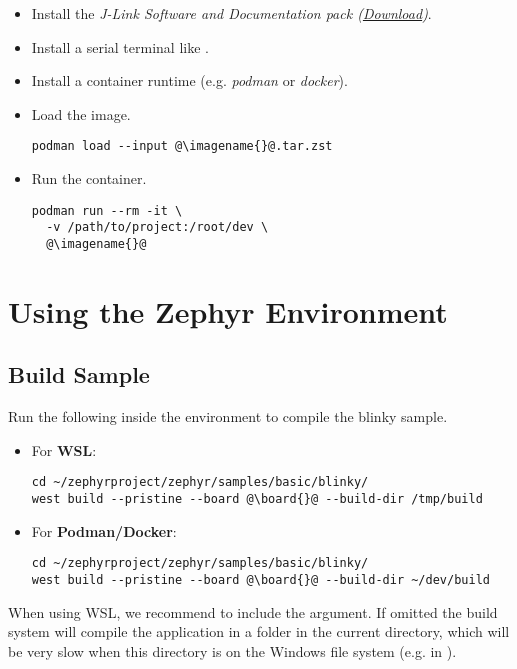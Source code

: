 \begin{itemize}
  \item Install the \emph{J-Link Software and Documentation pack (\href{https://www.segger.com/downloads/jlink}{Download})}.
  \item Install a serial terminal like .
  \item Install a container runtime (e.g. \emph{podman} or \emph{docker}).
  \item Load the image.
        \begin{lstlisting}
podman load --input @\imagename{}@.tar.zst
\end{lstlisting}
  \item Run the container.
        \begin{lstlisting}
podman run --rm -it \
  -v /path/to/project:/root/dev \
  @\imagename{}@
\end{lstlisting}
\end{itemize}

\newpage

\section{Using the Zephyr Environment}

\subsection{Build Sample}

Run the following inside the environment to compile the blinky sample.

\begin{itemize}
  \item For \textbf{WSL}:
  \begin{lstlisting}
cd ~/zephyrproject/zephyr/samples/basic/blinky/
west build --pristine --board @\board{}@ --build-dir /tmp/build
\end{lstlisting}
  \item For \textbf{Podman/Docker}:
  \begin{lstlisting}
cd ~/zephyrproject/zephyr/samples/basic/blinky/
west build --pristine --board @\board{}@ --build-dir ~/dev/build
\end{lstlisting}
\end{itemize}

\begin{infobox}
  When using WSL, we recommend to include the  argument.
  If omitted the build system will compile the application in a  folder in the current directory, which will be very slow when this directory is on the Windows file system (e.g. in ).
\end{infobox}

